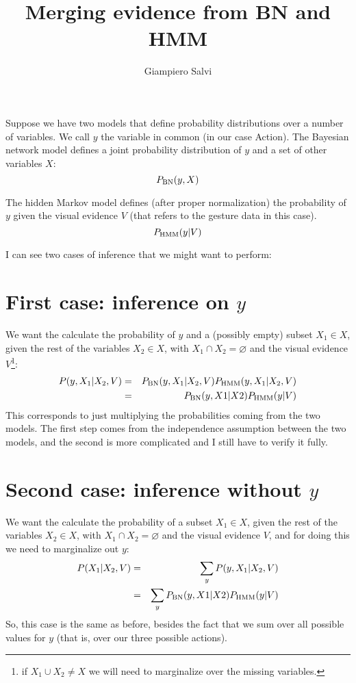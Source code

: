 \documentclass{article}
\title{Merging evidence from BN and HMM}
\author{Giampiero Salvi}
\begin{document}
\maketitle

\newcommand{\pbn}{\ensuremath P_{\scriptsize\mbox{BN}}}
\newcommand{\phmm}{\ensuremath P_{\scriptsize\mbox{HMM}}}

Suppose we have two models that define probability distributions over a number of variables.
We call $y$ the variable in common (in our case Action).
The Bayesian network model defines a joint probability distribution of $y$ and a set of other variables $X$:
\begin{equation}
\pbn(y,X)
\end{equation}

The hidden Markov model defines (after proper normalization) the probability of $y$ given the visual evidence $V$ (that refers to the gesture data in this case).
\begin{equation}
\phmm(y|V)
\end{equation}

I can see two cases of inference that we might want to perform:
\section{First case: inference on $y$}
We want the calculate the probability of $y$ and a (possibly empty) subset $X_1 \in X$, given the rest of the variables $X_2\in X$, with $X_1 \cap X_2 = \varnothing$ and the visual evidence $V$\footnote{if $X_1 \cup X_2 \neq X$ we will need to marginalize over the missing variables.}:
\begin{eqnarray}
P(y, X_1|X_2, V) &=& \pbn(y, X_1|X_2,V)\phmm(y,X_1|X_2,V) \\
&=& \pbn(y,X1|X2)\phmm(y|V) \label{bn-hmm1}
\end{eqnarray}
This corresponds to just multiplying the probabilities coming from the two models.
The first step comes from the independence assumption between the two models, and the second is more complicated and I still have to verify it fully.

\section{Second case: inference without $y$}
We want the calculate the probability of a subset $X_1 \in X$, given the rest of the variables $X_2\in X$, with $X_1 \cap X_2 = \varnothing$ and the visual evidence $V$, and for doing this we need to marginalize out $y$:
\begin{eqnarray}
P(X_1|X_2, V) &=& \sum_y P(y, X_1|X_2, V) \\
&=& \sum_y \pbn(y,X1|X2)\phmm(y|V) \label{bn-hmm2}
\end{eqnarray}
So, this case is the same as before, besides the fact that we sum over all possible values for $y$ (that is, over our three possible actions).
\end{document}
